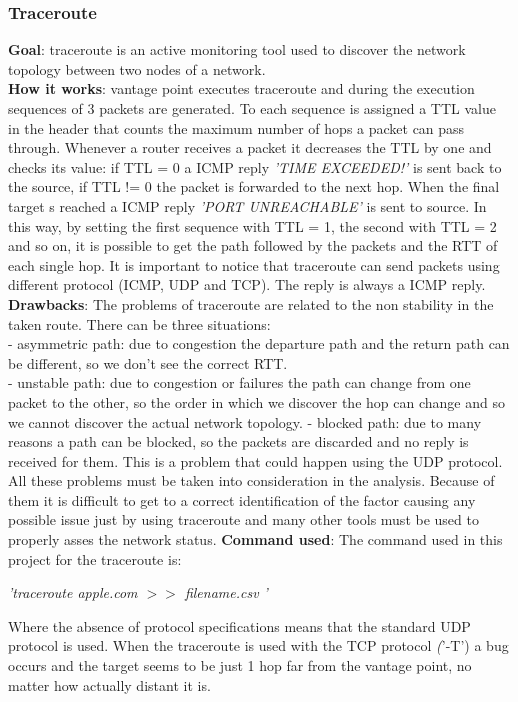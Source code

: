 \documentclass[a4paper,10pt]{article}
\begin{document}
\begin{multicols}{2}
\subsubsection*{Traceroute}
\small\textbf{Goal}: traceroute is an active monitoring tool used to discover the network topology between two nodes of a network.\\
\small\textbf{How it works}: vantage point executes traceroute and during the execution sequences of 3 packets are generated. To each sequence is
assigned a TTL value in the header that counts the maximum number of hops a packet can pass through. Whenever a router receives a packet
it decreases the TTL by one and checks its value: if TTL = 0 a ICMP reply \textit{'TIME EXCEEDED!'} is sent back to the source, if TTL != 0 
the packet is forwarded to the next hop. When the final target s reached a ICMP reply \textit{'PORT UNREACHABLE'} is sent to source. In this way, by setting
the first sequence with TTL = 1, the second with TTL = 2 and so on, it is possible to get the path followed by the packets and the RTT of each single hop.
It is important to notice that traceroute can send packets using different protocol (ICMP, UDP and TCP). The reply is always a ICMP reply.\\
\small\textbf{Drawbacks}: The problems of traceroute are related to the non stability in the taken route. There can be three situations:\\
- asymmetric path: due to congestion the departure path and the return path can be different, so we don't see the correct RTT.\\
- unstable path: due to congestion or failures the path can change from one packet to the other, so the order in which we discover the hop can change
and so we cannot discover the actual network topology.
- blocked path: due to many reasons a path can be blocked, so the packets are discarded and no reply is received for them. This is a problem that could
happen using the UDP protocol.\\
All these problems must be taken into consideration in the analysis. Because of them it is difficult to get to a correct identification of the 
factor causing any possible issue just by using traceroute and many other tools must be used to properly asses the network status.
\small\textbf{Command used}: The command used in this project for the traceroute is: 
\begin{center}\textit{'traceroute  apple.com  \(>>\)  filename.csv '} \end{center}
Where the absence of protocol specifications means that the standard UDP protocol is used. When the traceroute is used with the TCP protocol 
\textit('-T') a bug occurs and the target seems to be just 1 hop far from the vantage point, no matter how actually distant it is.


\end{multicols}
\end{document}
